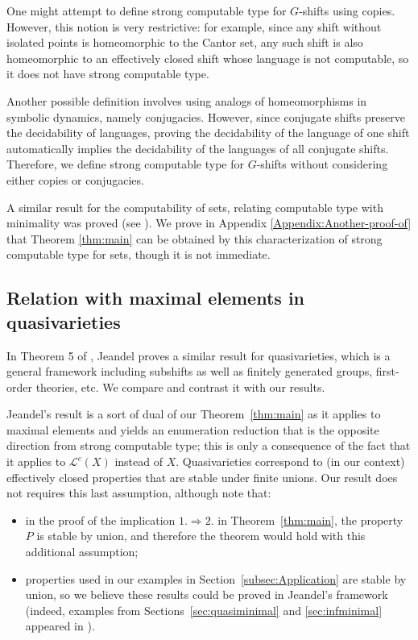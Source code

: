 \documentclass[french,american]{article}
\theoremstyle{plain}
\theoremstyle{definition}
\theoremstyle{remark}
\theoremstyle{plain}
\begin{document}
One might attempt to define strong computable type for $G$-shifts
using copies. However, this notion is very restrictive: for example, since any shift without isolated points is homeomorphic to the Cantor set, any such shift is also homeomorphic to an effectively closed shift whose language is not computable, so it does not have strong computable type.

Another possible definition involves using analogs of homeomorphisms
in symbolic dynamics, namely conjugacies. However, since conjugate
shifts preserve the decidability of languages, proving the decidability
of the language of one shift automatically implies the decidability
of the languages of all conjugate shifts. Therefore, we define strong
computable type for $G$-shifts without considering either copies
or conjugacies.

A similar result for the computability of sets, relating computable
type with minimality was proved (see \foreignlanguage{french}{\cite{AH22c,Phdamir2024})}.
We prove in Appendix \ref{Appendix:Another-proof-of} that Theorem
\ref{thm:main} can be obtained by this characterization of
strong computable type for sets, though it is not immediate.


\subsection{Relation with maximal elements in quasivarieties}\label{sec:quasivar}

In Theorem 5 of \cite{jeandel2017enumeration}, Jeandel proves a similar result for quasivarieties, which is a general framework including subshifts as well as finitely generated groups, first-order theories, etc. We compare and contrast it with our results.

Jeandel's result is a sort of dual of our Theorem~\ref{thm:main} as it applies to maximal elements and yields an enumeration reduction that is the opposite direction from strong computable type; this is only a consequence of the fact that it applies to $\mathcal{L}^c(X)$ instead of $X$. Quasivarieties correspond to (in our context) effectively closed properties that are stable under finite unions. Our result does not requires this last assumption, although note that:
\begin{itemize}
\item in the proof of the implication $1.\Rightarrow 2.$ in Theorem~\ref{thm:main}, the property $P$ is stable by union, and therefore the theorem would hold with this additional assumption;
\item properties used in our examples in Section~\ref{subsec:Application} are stable by union, so we believe these results could be proved in Jeandel's framework (indeed, examples from Sections~\ref{sec:quasiminimal} and \ref{sec:infminimal} appeared in \cite{jeandel2017enumeration}).
\end{itemize}
\end{document}
